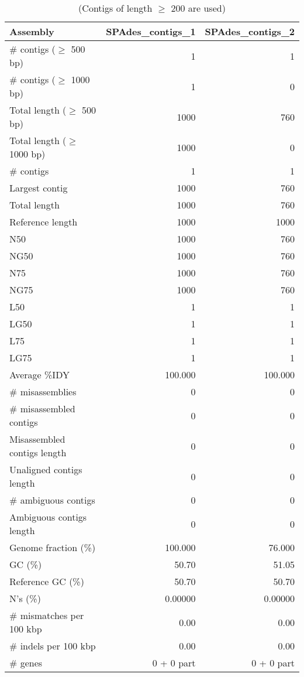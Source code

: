 \begin{table}[ht]
\begin{center}
\caption{(Contigs of length $\geq$ 200 are used)}
\begin{tabular}{|l*{2}{|r}|}
\hline
Assembly & SPAdes\_contigs\_1 & SPAdes\_contigs\_2 \\ \hline
\# contigs ($\geq$ 500 bp) & 1 & 1 \\ \hline
\# contigs ($\geq$ 1000 bp) & 1 & 0 \\ \hline
Total length ($\geq$ 500 bp) & 1000 & 760 \\ \hline
Total length ($\geq$ 1000 bp) & 1000 & 0 \\ \hline
\# contigs & 1 & 1 \\ \hline
Largest contig & 1000 & 760 \\ \hline
Total length & 1000 & 760 \\ \hline
Reference length & 1000 & 1000 \\ \hline
N50 & 1000 & 760 \\ \hline
NG50 & 1000 & 760 \\ \hline
N75 & 1000 & 760 \\ \hline
NG75 & 1000 & 760 \\ \hline
L50 & 1 & 1 \\ \hline
LG50 & 1 & 1 \\ \hline
L75 & 1 & 1 \\ \hline
LG75 & 1 & 1 \\ \hline
Average \%IDY & 100.000 & 100.000 \\ \hline
\# misassemblies & 0 & 0 \\ \hline
\# misassembled contigs & 0 & 0 \\ \hline
Misassembled contigs length & 0 & 0 \\ \hline
Unaligned contigs length & 0 & 0 \\ \hline
\# ambiguous contigs & 0 & 0 \\ \hline
Ambiguous contigs length & 0 & 0 \\ \hline
Genome fraction (\%) & 100.000 & 76.000 \\ \hline
GC (\%) & 50.70 & 51.05 \\ \hline
Reference GC (\%) & 50.70 & 50.70 \\ \hline
N's (\%) & 0.00000 & 0.00000 \\ \hline
\# mismatches per 100 kbp & 0.00 & 0.00 \\ \hline
\# indels per 100 kbp & 0.00 & 0.00 \\ \hline
\# genes & 0 + 0 part & 0 + 0 part \\ \hline

\end{tabular}
\end{center}
\end{table}
